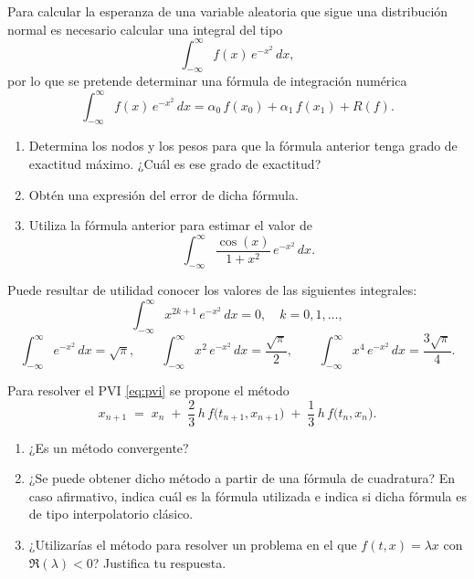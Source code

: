 \documentclass[12pt]{article}
\begin{document}
    \begin{ejercicio}[2 puntos] Para calcular la esperanza de una variable aleatoria que sigue una distribución normal es necesario calcular una integral del tipo
    \[
      \int_{-\infty}^{\infty} f(x)\,e^{-x^2}\,dx,
    \]
    por lo que se pretende determinar una fórmula de integración numérica
    \[
      \int_{-\infty}^{\infty} f(x)\,e^{-x^2}\,dx
      = \alpha_0\,f(x_0) + \alpha_1\,f(x_1) + R(f).
    \]
    \begin{enumerate}
      \item Determina los nodos y los pesos para que la fórmula anterior tenga grado de exactitud máximo. ¿Cuál es ese grado de exactitud?
      \item Obtén una expresión del error de dicha fórmula.
      \item Utiliza la fórmula anterior para estimar el valor de
      \[
        \int_{-\infty}^{\infty} \frac{\cos(x)}{1+x^2}\,e^{-x^2}\,dx.
      \]
    \end{enumerate}
    
    \begin{observacion}
    Puede resultar de utilidad conocer los valores de las siguientes integrales:
    \[
      \int_{-\infty}^{\infty} x^{2k+1}\,e^{-x^2}\,dx = 0,\quad k=0,1,\dots,
    \]
    \[
      \int_{-\infty}^{\infty} e^{-x^2}\,dx = \sqrt{\pi},\qquad
      \int_{-\infty}^{\infty} x^2\,e^{-x^2}\,dx = \frac{\sqrt{\pi}}{2},\qquad
      \int_{-\infty}^{\infty} x^4\,e^{-x^2}\,dx = \frac{3\sqrt{\pi}}{4}.
    \]
    \end{observacion} 
    \end{ejercicio}
\begin{ejercicio}[3 puntos] Para resolver el PVI \eqref{eq:pvi} se propone el método
    \[
      x_{n+1} \;=\; x_n \;+\;\frac{2}{3}\,h\,f\bigl(t_{n+1},x_{n+1}\bigr)
      \;+\;\frac{1}{3}\,h\,f\bigl(t_n,x_n\bigr).
    \]
    \begin{enumerate}
      \item ¿Es un método convergente?
      \item ¿Se puede obtener dicho método a partir de una fórmula de cuadratura? En caso afirmativo, indica cuál es la fórmula utilizada e indica si dicha fórmula es de tipo interpolatorio clásico.
      \item ¿Utilizarías el método para resolver un problema en el que \(f(t,x)=\lambda x\) con \(\Re(\lambda)<0\)? Justifica tu respuesta.
    \end{enumerate}
  \end{ejercicio}
\end{document}
